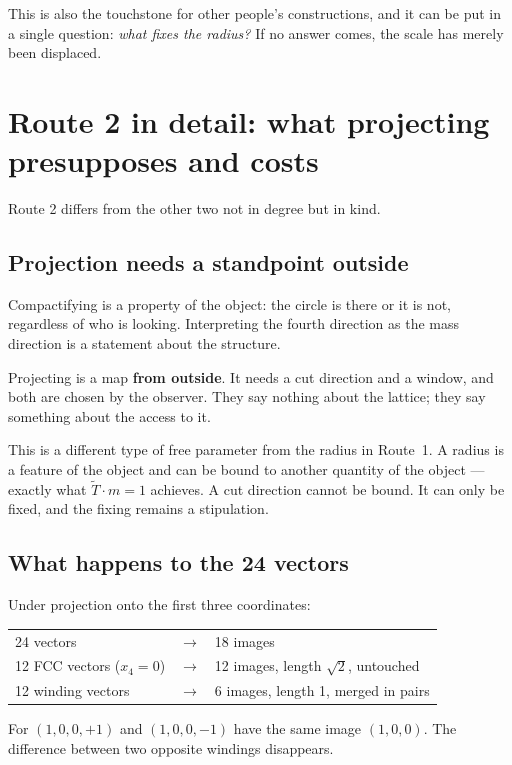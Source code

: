 This is also the touchstone for other people's constructions, and it
can be put in a single question: \emph{what fixes the radius?} If no
answer comes, the scale has merely been displaced.

\chapter{Route 2 in detail: what projecting presupposes and costs}

Route 2 differs from the other two not in degree but in kind.

\section{Projection needs a standpoint outside}

Compactifying is a property of the object: the circle is there or it is
not, regardless of who is looking. Interpreting the fourth direction as
the mass direction is a statement about the structure.

Projecting is a map \textbf{from outside}. It needs a cut direction and
a window, and both are chosen by the observer. They say nothing about
the lattice; they say something about the access to it.

This is a different type of free parameter from the radius in Route~1.
A radius is a feature of the object and can be bound to another
quantity of the object --- exactly what $\tilde T \cdot m = 1$
achieves. A cut direction cannot be bound. It can only be fixed, and
the fixing remains a stipulation.

\section{What happens to the 24 vectors}

Under projection onto the first three coordinates:
\begin{center}
\begin{tabular}{lcl}
24 vectors & $\longrightarrow$ & 18 images \\[4pt]
12 FCC vectors ($x_4 = 0$) & $\longrightarrow$
  & 12 images, length $\sqrt2$, untouched \\
12 winding vectors & $\longrightarrow$
  & \phantom{1}6 images, length 1, merged in pairs \\
\end{tabular}
\end{center}

For $(1,0,0,+1)$ and $(1,0,0,-1)$ have the same image $(1,0,0)$. The
difference between two opposite windings disappears.

